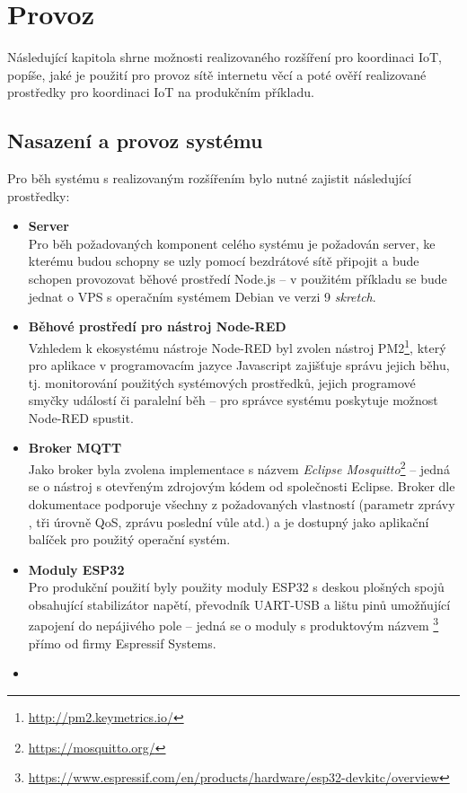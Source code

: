 \chapter{Provoz}
\label{ch:provoz}

Následující kapitola shrne možnosti realizovaného rozšíření pro koordinaci IoT, popíše, jaké je použití pro provoz
sítě internetu věcí a poté ověří realizované prostředky pro koordinaci IoT na produkčním příkladu.

\section{Nasazení a provoz systému}\label{sec:nasazení-a-provoz-systému}
Pro běh systému s realizovaným rozšířením bylo nutné zajistit následující prostředky:
\begin{itemize}
    \item \textbf{Server} \\
    Pro běh požadovaných komponent celého systému je požadován server, ke kterému budou schopny se uzly pomocí
    bezdrátové sítě připojit a bude schopen provozovat běhové prostředí Node.js -- v použitém příkladu se bude jednat
    o VPS s operačním systémem Debian ve verzi 9 \textit{skretch}.

    \item \textbf{Běhové prostředí pro nástroj Node-RED} \\
    Vzhledem k ekosystému nástroje Node-RED byl zvolen nástroj PM2\footnote{\url{http://pm2.keymetrics.io/}}, který pro
    aplikace v programovacím jazyce Javascript zajišťuje správu jejich běhu, tj. monitorování použitých systémových
    prostředků, jejich programové smyčky událostí či paralelní běh -- pro správce systému poskytuje možnost Node-RED
    spustit.

    \item \textbf{Broker MQTT} \\
    Jako broker byla zvolena implementace s názvem \emph{Eclipse Mosquitto}\footnote{\url{https://mosquitto.org/}} --
    jedná se o nástroj s otevřeným zdrojovým kódem od společnosti Eclipse.
    Broker dle dokumentace podporuje všechny z požadovaných vlastností (parametr zprávy , tři úrovně QoS,
    zprávu poslední vůle atd.) a je dostupný jako aplikační balíček pro použitý operační systém.

    \item \textbf{Moduly ESP32} \\
    Pro produkční použití byly použity moduly ESP32 s deskou plošných spojů obsahující stabilizátor napětí, převodník
    UART-USB a lištu pinů umožňující zapojení do nepájivého pole -- jedná se o moduly s produktovým názvem
    \footnote{\url{https://www.espressif.com/en/products/hardware/esp32-devkitc/overview}}
    přímo od firmy Espressif Systems.

    \item
\end{itemize}

